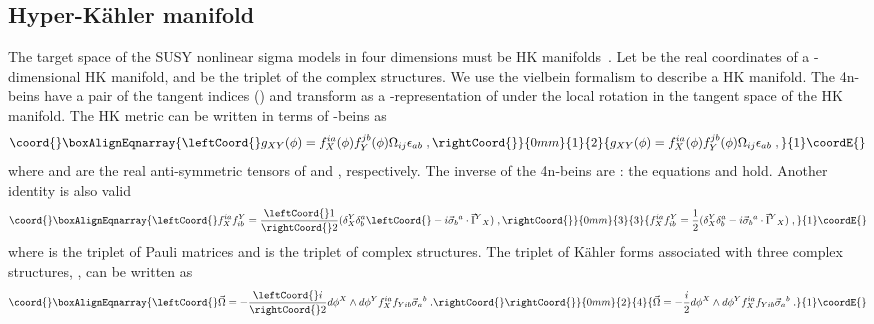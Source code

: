 \documentclass[a4paper,12pt]{article}
\providecommand{\kahler}{K\"{a}hler }
\begin{document}
\subsection{Hyper-\kahler manifold}
The target space of the \coordHE{} 
SUSY nonlinear sigma models in four dimensions  
must be HK manifolds~\cite{AF1}.  
Let \coordHE{}  \coordHE{} be the real 
coordinates of a \coordHE{}-dimensional HK manifold, 
and \coordHE{}  \coordHE{} be 
the triplet of the complex structures.  
We use the vielbein formalism to describe a HK manifold. 
The 4n-beins \coordHE{} have 
a pair of the tangent indices (\coordHE{}) and 
transform as a \coordHE{}-representation of \coordHE{} 
under the local rotation in the tangent space 
of the HK manifold. 
The HK metric can be written in terms of \coordHE{}-beins as 
\begin{eqnarray}\coord{}\boxAlignEqnarray{\leftCoord{}
  g_{XY}(\phi) = f^{ia}_X(\phi) f^{jb}_Y(\phi) 
  \Omega _{ij}\epsilon _{ab}\;,
\rightCoord{}}{0mm}{1}{2}{
  g_{XY}(\phi) = f^{ia}_X(\phi) f^{jb}_Y(\phi) 
  \Omega _{ij}\epsilon _{ab}\;,
}{1}\coordE{}\end{eqnarray}
where \coordHE{} and \coordHE{} are 
the real anti-symmetric tensors of \coordHE{} and \coordHE{}, respectively. 
The inverse of the 4n-beins are \coordHE{}: 
the equations \coordHE{} 
and \coordHE{} hold. 
Another identity is also valid 
\begin{eqnarray}\coord{}\boxAlignEqnarray{\leftCoord{}
f^{ia}_X f^Y_{ib} = \frac{\leftCoord{}1}{\rightCoord{}2}(\delta ^Y_X\delta ^a_b 
  \leftCoord{}- i\vec{\sigma} _b{}^a \cdot \vec{\rm I} ^Y{}_X) \;, 
\label{f-identity}
\rightCoord{}}{0mm}{3}{3}{
f^{ia}_X f^Y_{ib} = \frac{1}{2}(\delta ^Y_X\delta ^a_b 
  - i\vec{\sigma} _b{}^a \cdot \vec{\rm I} ^Y{}_X) \;, 
}{1}\coordE{}\end{eqnarray}
where \myHighlight{$\vec{\sigma}$}\coordHE{} is the triplet of Pauli matrices and 
\coordHE{} is the triplet of complex structures. 
The triplet of \kahler forms associated 
with three complex structures, 
\coordHE{}, can be written as  
\begin{eqnarray}\coord{}\boxAlignEqnarray{\leftCoord{}
 \vec{\Omega} = -\frac{\leftCoord{}i}{\rightCoord{}2}d\phi^X\wedge d\phi^Y f^{ia}_X f_{Yib}
                \vec{\sigma}_a{}^b \;. \rightCoord{}
 \label{kahler-form}
\rightCoord{}}{0mm}{2}{4}{
 \vec{\Omega} = -\frac{i}{2}d\phi^X\wedge d\phi^Y f^{ia}_X f_{Yib}
                \vec{\sigma}_a{}^b \;. 
 }{1}\coordE{}\end{eqnarray}
\end{document}
